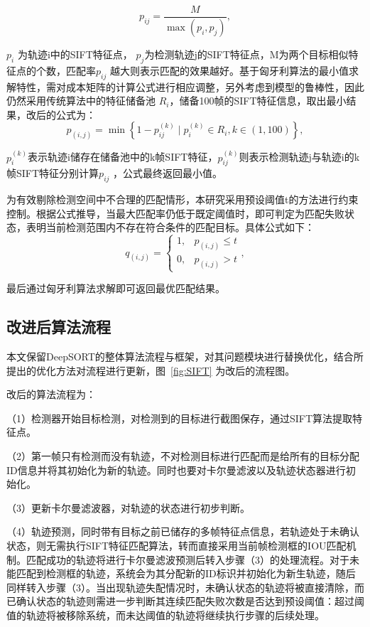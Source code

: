 \begin{equation}
	p_{ij} = \frac{M}{\max(p_i, p_j)},
\end{equation}

 \(p_i\) 为轨迹i中的SIFT特征点， \(p_j\)为检测轨迹j的SIFT特征点，M为两个目标相似特征点的个数，匹配率\(p_{ij}\) 越大则表示匹配的效果越好。基于匈牙利算法的最小值求解特性，需对成本矩阵的计算公式进行相应调整，另外考虑到模型的鲁棒性，因此仍然采用传统算法中的特征储备池 \(R_i\)，储备100帧的SIFT特征信息，取出最小结果，改后的公式为：
 \begin{equation}
 	p_{(i,j)} = \min\left\{1 - p_{ij}^{(k)} \mid p_{i}^{(k)}\in R_{i}, k\in(1,100)\right\},
 \end{equation}
 
\(p_{i}^{(k)}\)表示轨迹i储存在储备池中的k帧SIFT特征，\(p_{ij}^{(k)}\)则表示检测轨迹j与轨迹i的k帧SIFT特征分别计算\(p_{ij}\) ，公式最终返回最小值。

为有效剔除检测空间中不合理的匹配情形，本研究采用预设阈值t的方法进行约束控制。根据公式推导，当最大匹配率仍低于既定阈值时，即可判定为匹配失败状态，表明当前检测范围内不存在符合条件的匹配目标。具体公式如下： 
\begin{equation}
	q_{(i,j)} = 
	\begin{cases}
		1, & p_{(i,j)} \leq t \\
		0, & p_{(i,j)} > t
	\end{cases},
\end{equation}

最后通过匈牙利算法求解即可返回最优匹配结果。

\subsection{改进后算法流程}

本文保留DeepSORT的整体算法流程与框架，对其问题模块进行替换优化，结合所提出的优化方法对流程进行更新，图~\ref{fig:SIFT} 为改后的流程图。 

改后的算法流程为： 

（1）检测器开始目标检测，对检测到的目标进行截图保存，通过SIFT算法提取特征点。 

（2）第一帧只有检测而没有轨迹，不对检测目标进行匹配而是给所有的目标分配ID信息并将其初始化为新的轨迹。同时也要对卡尔曼滤波以及轨迹状态器进行初始化。 

（3）更新卡尔曼滤波器，对轨迹的状态进行初步判断。 

（4）轨迹预测，同时带有目标之前已储存的多帧特征点信息，若轨迹处于未确认状态，则无需执行SIFT特征匹配算法，转而直接采用当前帧检测框的IOU匹配机制。匹配成功的轨迹将进行卡尔曼滤波预测后转入步骤（3）的处理流程。对于未能匹配到检测框的轨迹，系统会为其分配新的ID标识并初始化为新生轨迹，随后同样转入步骤（3）。当出现轨迹失配情况时，未确认状态的轨迹将被直接清除，而已确认状态的轨迹则需进一步判断其连续匹配失败次数是否达到预设阈值：超过阈值的轨迹将被移除系统，而未达阈值的轨迹将继续执行步骤的后续处理。

